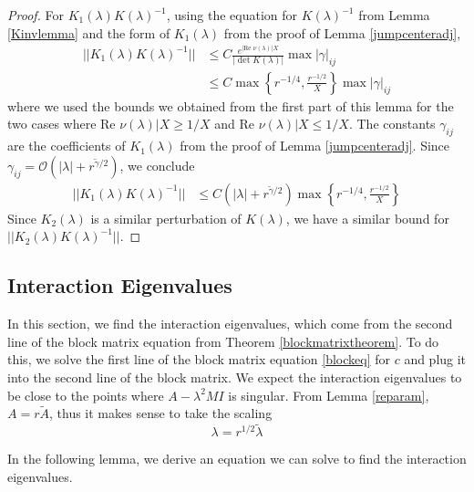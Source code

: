 \documentclass[thesis.tex]{subfiles}
\begin{document}
\begin{lemma}
\begin{proof}
For $K_1(\lambda)K(\lambda)^{-1}$, using the equation for $K(\lambda)^{-1}$ from Lemma \ref{Kinvlemma} and the form of $K_1(\lambda)$ from the proof of Lemma \ref{jumpcenteradj},
\begin{align*}
||K_1(\lambda)K(\lambda)^{-1}|| &\leq 
C \frac{e^{|\text{Re }\nu(\lambda)|X}}{|\det K(\lambda)|} \max {|\gamma|_{ij}} \\
&\leq C \max \left\{ r^{-1/4}, \frac{r^{-1/2}}{X} \right\} \max {|\gamma|_{ij}}
\end{align*}
where we used the bounds we obtained from the first part of this lemma for the two cases where $\text{Re }\nu(\lambda)|X \geq 1/X$ and $\text{Re }\nu(\lambda)|X \leq 1/X$. The constants $\gamma_{ij}$ are the coefficients of $K_1(\lambda)$ from the proof of Lemma \ref{jumpcenteradj}. Since $\gamma_{ij} = \mathcal{O}(|\lambda| + r^{\tilde{\gamma}/2})$, we conclude
\begin{align*}
||K_1(\lambda)K(\lambda)^{-1}|| &\leq C (|\lambda| + r^{\tilde{\gamma}/2}) \max \left\{ r^{-1/4}, \frac{r^{-1/2}}{X} \right\}
\end{align*}
Since $K_2(\lambda)$ is a similar perturbation of $K(\lambda)$, we have a similar bound for $||K_2(\lambda)K(\lambda)^{-1}||$.
\end{proof}
\end{lemma}

\subsection{Interaction Eigenvalues}

In this section, we find the interaction eigenvalues, which come from the second line of the block matrix equation from Theorem \ref{blockmatrixtheorem}. To do this, we solve the first line of the block matrix equation \eqref{blockeq} for $c$ and plug it into the second line of the block matrix. We expect the interaction eigenvalues to be close to the points where $A - \lambda^2 M I$ is singular. From Lemma \ref{reparam}, $A = r \tilde{A}$, thus it makes sense to take the scaling
\[
\lambda = r^{1/2}\tilde{\lambda}
\]

In the following lemma, we derive an equation we can solve to find the interaction eigenvalues.
\end{document}
